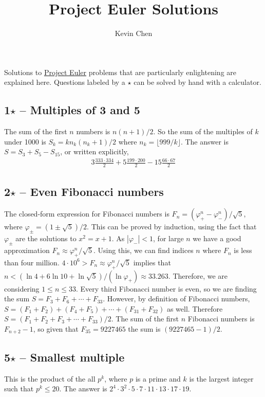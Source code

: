 \documentclass{article}
\title{Project Euler Solutions}
\author{Kevin Chen}
\begin{document}
\maketitle

Solutions to \href{https://projecteuler.net/}{Project Euler} problems that are particularly enlightening are explained here. 
Questions labeled by a $\star$ can be solved by hand with a calculator. \\

\subsection*{1$\star$ -- Multiples of 3 and 5} 
The sum of the first $n$ numbers is $n(n+1)/2$. 
So the sum of the multiples of $k$ under 1000 is $S_k = k n_k(n_k+1)/2$ where $n_k=\lfloor 999/k \rfloor$. 
The answer is $S = S_3 + S_5 - S_{15}$, or written explicitly,
\begin{align*}
	\boxed{ 3\frac{333 \cdot 334}{2} + 5\frac{199 \cdot 200}{2} - 15\frac{66 \cdot 67}{2} } 
\end{align*}


\subsection*{2$\star$ -- Even Fibonacci numbers} 
The closed-form expression for Fibonacci numbers is $F_n = (\varphi_+^n - \varphi_-^n)/\sqrt{5}$, where $\varphi_\pm = (1\pm\sqrt{5})/2$.
This can be proved by induction, using the fact that $\varphi_\pm$ are the solutions to $x^2 = x + 1$.
As $|\varphi_-| < 1$, for large $n$ we have a good approximation $F_n \approx \varphi_+^n/\sqrt{5}$. 
Using this, we can find indices $n$ where $F_n$ is less than four million. 
$4 \cdot 10^6 > F_n \approx \varphi_+^n/\sqrt{5}$ implies that $n < (\ln 4 + 6 \ln 10 + \ln \sqrt{5})/(\ln \varphi_+) \approx 33.263$. 
Therefore, we are considering $1 \leq n \leq 33$. 
Every third Fibonacci number is even, so we are finding the sum $S = F_3 + F_6 + \cdots + F_{33}$. 
However, by definition of Fibonacci numbers, $S = (F_1 + F_2) + (F_4 + F_5) + \cdots + (F_{31} + F_{32})$ as well. 
Therefore $S = (F_1 + F_2 + F_3 + \cdots + F_{33})/2$. 
The sum of the first $n$ Fibonacci numbers is $F_{n+2} - 1$, so given that $F_{35} = 9227465$ the sum is $\boxed{ (9227465 - 1)/2 }$.

\subsection*{5$\star$ -- Smallest multiple} 
This is the product of the all $p^k$, where $p$ is a prime and $k$ is the largest integer such that $p^k \leq 20$.
The answer is $\boxed{ 2^4 \cdot 3^2 \cdot 5 \cdot 7 \cdot 11 \cdot 13 \cdot 17 \cdot 19}$.
\end{document}
